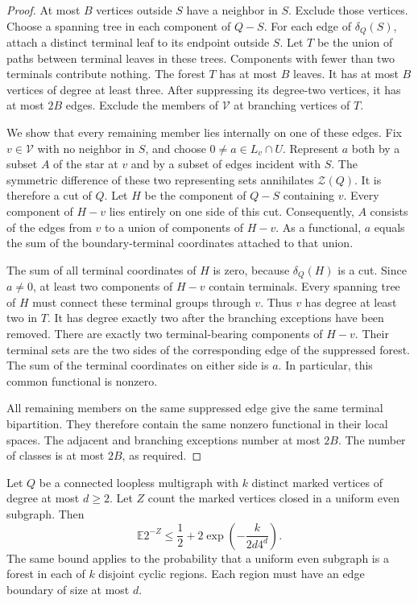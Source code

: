 \begin{proof}
At most $B$ vertices outside $S$ have a neighbor in $S$.
Exclude those vertices.
Choose a spanning tree in each component of $Q-S$.
For each edge of $\delta_Q(S)$, attach a distinct terminal leaf to its endpoint outside $S$.
Let $T$ be the union of paths between terminal leaves in these trees.
Components with fewer than two terminals contribute nothing.
The forest $T$ has at most $B$ leaves.
It has at most $B$ vertices of degree at least three.
After suppressing its degree-two vertices, it has at most $2B$ edges.
Exclude the members of $\mathcal V$ at branching vertices of $T$.

We show that every remaining member lies internally on one of these edges.
Fix $v\in\mathcal V$ with no neighbor in $S$, and choose $0\ne a\in L_v\cap U$.
Represent $a$ both by a subset $A$ of the star at $v$ and by a subset of edges incident with $S$.
The symmetric difference of these two representing sets annihilates $\mathcal Z(Q)$.
It is therefore a cut of $Q$.
Let $H$ be the component of $Q-S$ containing $v$.
Every component of $H-v$ lies entirely on one side of this cut.
Consequently, $A$ consists of the edges from $v$ to a union of components of $H-v$.
As a functional, $a$ equals the sum of the boundary-terminal coordinates attached to that union.

The sum of all terminal coordinates of $H$ is zero, because $\delta_Q(H)$ is a cut.
Since $a\ne0$, at least two components of $H-v$ contain terminals.
Every spanning tree of $H$ must connect these terminal groups through $v$.
Thus $v$ has degree at least two in $T$.
It has degree exactly two after the branching exceptions have been removed.
There are exactly two terminal-bearing components of $H-v$.
Their terminal sets are the two sides of the corresponding edge of the suppressed forest.
The sum of the terminal coordinates on either side is $a$.
In particular, this common functional is nonzero.

All remaining members on the same suppressed edge give the same terminal bipartition.
They therefore contain the same nonzero functional in their local spaces.
The adjacent and branching exceptions number at most $2B$.
The number of classes is at most $2B$, as required.
\end{proof}

\begin{theorem}
\label{thm:terminal-forest-cut-estimate}
Let $Q$ be a connected loopless multigraph with $k$ distinct marked vertices of degree at most $d\ge2$.
Let $Z$ count the marked vertices closed in a uniform even subgraph.
Then
\[
 \mathbb E2^{-Z}\le\frac12+2\exp\!\left(-\frac{k}{2d4^d}\right).
\]
The same bound applies to the probability that a uniform even subgraph is a forest in each of $k$ disjoint cyclic regions.
Each region must have an edge boundary of size at most $d$.
\end{theorem}

